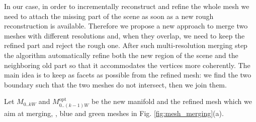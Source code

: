 In our case, in order to incrementally reconstruct and refine the whole mesh we need to attach the missing part of the scene as soon as a new rough reconstruction is available. Therefore we propose a new approach to merge two meshes with  different resolutions and, when they overlap, we need to keep the refined part and reject the rough one.
After such multi-resolution merging step the algorithm automatically refine both the new region of the scene and the neighboring old part so that it accommodates the vertices more coherently.
The main idea is to keep as facets as possible from the refined mesh: we find the two boundary such that the two meshes do not intersect, then we join them.

Let $\mathit{M}_{0..kW}$ and  $\mathit{M}_{0..(k-1)W}^{\text{opt}}$ be the new manifold and the refined mesh which we aim at merging, \eg, blue and green meshes in Fig. \ref{fig:mesh_merging}(a).



